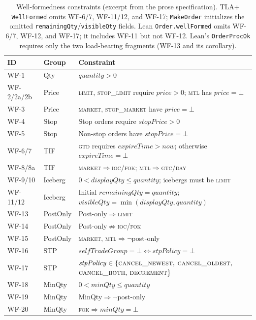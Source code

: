 \documentclass[11pt,a4paper]{article}
\begin{document}
\begin{table}[H]
\centering
\caption{Well-formedness constraints (excerpt from the prose
specification). TLA+ \texttt{WellFormed} omits WF-6/7, WF-11/12,
and WF-17; \texttt{MakeOrder} initializes the omitted
\texttt{remainingQty}/\texttt{visibleQty} fields. Lean
\texttt{Order.wellFormed} omits WF-6/7, WF-12, and WF-17; it
includes WF-11 but not WF-12. Lean's \texttt{OrderProcOk}
requires only the two load-bearing fragments (WF-13 and its
corollary).}
\label{tab:wf}
\small
\begin{tabular}{@{}llL{8cm}@{}}
\toprule
ID & Group & Constraint \\
\midrule
WF-1       & Qty     & $\mathit{quantity} > 0$ \\
WF-2/2a/2b & Price   & \textsc{limit}, \textsc{stop\_limit} require
                       $\mathit{price} > 0$; \textsc{mtl} has $\mathit{price}=\bot$ \\
WF-3       & Price   & \textsc{market}, \textsc{stop\_market} have $\mathit{price}=\bot$ \\
WF-4       & Stop    & Stop orders require $\mathit{stopPrice} > 0$ \\
WF-5       & Stop    & Non-stop orders have $\mathit{stopPrice}=\bot$ \\
WF-6/7     & TIF     & \textsc{gtd} requires $\mathit{expireTime} > \mathit{now}$; otherwise $\mathit{expireTime}=\bot$ \\
WF-8/8a    & TIF     & \textsc{market}$\Rightarrow$\textsc{ioc}/\textsc{fok};
                       \textsc{mtl}$\Rightarrow$\textsc{gtc}/\textsc{day} \\
WF-9/10    & Iceberg & $0 < \mathit{displayQty} \leq \mathit{quantity}$; icebergs must be \textsc{limit} \\
WF-11/12   & Iceberg & Initial $\mathit{remainingQty}=\mathit{quantity}$; $\mathit{visibleQty}=\min(\mathit{displayQty},\mathit{quantity})$ \\
WF-13      & PostOnly& Post-only$\Rightarrow$\textsc{limit} \\
WF-14      & PostOnly& Post-only$\not\Rightarrow$\textsc{ioc}/\textsc{fok} \\
WF-15      & PostOnly& \textsc{market}, \textsc{mtl}$\Rightarrow$$\neg$post-only \\
WF-16      & STP     & $\mathit{selfTradeGroup}=\bot \iff \mathit{stpPolicy}=\bot$ \\
WF-17      & STP     & $\mathit{stpPolicy}\in\{\textsc{cancel\_newest},$ $\textsc{cancel\_oldest},$ $\textsc{cancel\_both},$ $\textsc{decrement}\}$ \\
WF-18      & MinQty  & $0 < \mathit{minQty} \leq \mathit{quantity}$ \\
WF-19      & MinQty  & MinQty$\Rightarrow$$\neg$post-only \\
WF-20      & MinQty  & \textsc{fok}$\Rightarrow$$\mathit{minQty}=\bot$ \\
\bottomrule
\end{tabular}
\end{table}
\end{document}

